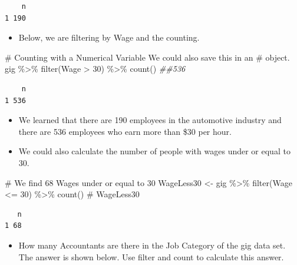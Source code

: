 \documentclass[
  letterpaper,
  DIV=11,
  numbers=noendperiod]{scrreprt}
\newenvironment{Shaded}{\begin{snugshade}}{\end{snugshade}}
\newcommand{\CommentTok}[1]{\textcolor[rgb]{0.37,0.37,0.37}{#1}}
\newcommand{\DecValTok}[1]{\textcolor[rgb]{0.68,0.00,0.00}{#1}}
\newcommand{\DocumentationTok}[1]{\textcolor[rgb]{0.37,0.37,0.37}{\textit{#1}}}
\newcommand{\FunctionTok}[1]{\textcolor[rgb]{0.28,0.35,0.67}{#1}}
\newcommand{\NormalTok}[1]{\textcolor[rgb]{0.00,0.23,0.31}{#1}}
\newcommand{\OtherTok}[1]{\textcolor[rgb]{0.00,0.23,0.31}{#1}}
\newcommand{\SpecialCharTok}[1]{\textcolor[rgb]{0.37,0.37,0.37}{#1}}
\providecommand{\tightlist}{%
  \setlength{\itemsep}{0pt}\setlength{\parskip}{0pt}}\usepackage{longtable,booktabs,array}
\begin{document}
\begin{verbatim}
    n
1 190
\end{verbatim}

\begin{itemize}
\tightlist
\item
  Below, we are filtering by Wage and the counting.
\end{itemize}

\begin{Shaded}
\begin{Highlighting}[]
\CommentTok{\# Counting with a Numerical Variable We could also save this in an}
\CommentTok{\# object.}
\NormalTok{gig }\SpecialCharTok{\%\textgreater{}\%}
    \FunctionTok{filter}\NormalTok{(Wage }\SpecialCharTok{\textgreater{}} \DecValTok{30}\NormalTok{) }\SpecialCharTok{\%\textgreater{}\%}
    \FunctionTok{count}\NormalTok{()  }\DocumentationTok{\#\#536}
\end{Highlighting}
\end{Shaded}

\begin{verbatim}
    n
1 536
\end{verbatim}

\begin{itemize}
\item
  We learned that there are 190 employees in the automotive industry and
  there are 536 employees who earn more than \$30 per hour.
\item
  We could also calculate the number of people with wages under or equal
  to 30.
\end{itemize}

\begin{Shaded}
\begin{Highlighting}[]
\CommentTok{\# We find 68 Wages under or equal to 30}
\NormalTok{WageLess30 }\OtherTok{\textless{}{-}}\NormalTok{ gig }\SpecialCharTok{\%\textgreater{}\%}
    \FunctionTok{filter}\NormalTok{(Wage }\SpecialCharTok{\textless{}=} \DecValTok{30}\NormalTok{) }\SpecialCharTok{\%\textgreater{}\%}
    \FunctionTok{count}\NormalTok{()  }\CommentTok{\#}
\NormalTok{WageLess30}
\end{Highlighting}
\end{Shaded}

\begin{verbatim}
   n
1 68
\end{verbatim}

\begin{itemize}
\tightlist
\item
  How many Accountants are there in the Job Category of the gig data
  set. The answer is shown below. Use filter and count to calculate this
  answer.
\end{itemize}
\end{document}
